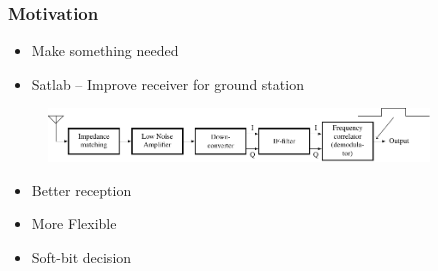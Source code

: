 






\begin{frame} \frametitle{Motivation}
    \begin{itemize}
    \item Make something needed
    \item Satlab -- Improve receiver for ground station
    \end{itemize}

\begin{figure}[htbp]
    \centering
    \includegraphics[width=0.9\textwidth]{img/adf7021}
    \label{fig:adf7021}
\end{figure}

\begin{itemize}
    \item Better reception
    \item More Flexible
    \item Soft-bit decision
\end{itemize}

\end{frame}


